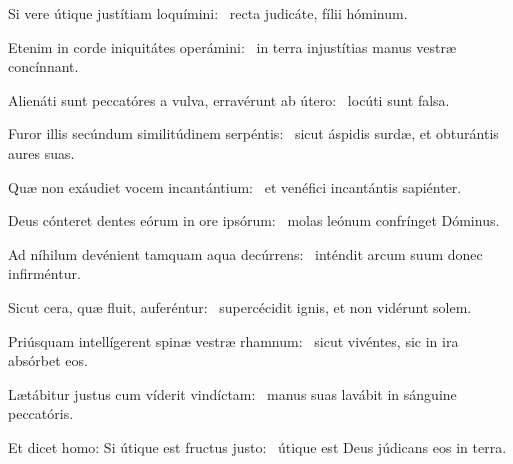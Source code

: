\item Si vere útique justítiam loquímini:~\psstar{} recta judicáte, fílii hóminum.

\item Etenim in corde iniquitátes operámini:~\psstar{} in terra injustítias manus vestræ concínnant.

\item Alienáti sunt peccatóres a vulva, erravérunt ab útero:~\psstar{} locúti sunt falsa.

\item Furor illis secúndum similitúdinem serpéntis:~\psstar{} sicut áspidis surdæ, et obturántis aures suas.

\item Quæ non exáudiet vocem incantántium:~\psstar{} et venéfici incantántis sapiénter.

\item Deus cónteret dentes eórum in ore ipsórum:~\psstar{} molas leónum confrínget Dóminus.

\item Ad níhilum devénient tamquam aqua decúrrens:~\psstar{} inténdit arcum suum donec infirméntur.

\item Sicut cera, quæ fluit, auferéntur:~\psstar{} supercécidit ignis, et non vidérunt solem.

\item Priúsquam intellígerent spinæ vestræ rhamnum:~\psstar{} sicut vivéntes, sic in ira absórbet eos.

\item Lætábitur justus cum víderit vindíctam:~\psstar{} manus suas lavábit in sánguine peccatóris.

\item Et dicet homo: Si útique est fructus justo:~\psstar{} útique est Deus júdicans eos in terra.